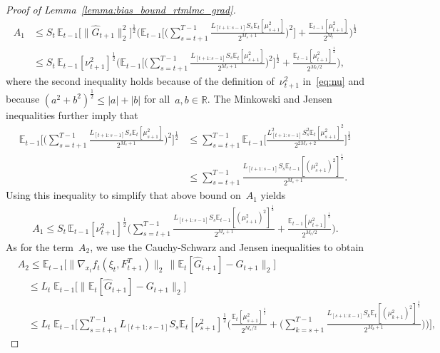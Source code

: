 \documentclass[10pt,a4paper]{amsart}
\newcommand{\EE}{\mathbb{E}}
\begin{document}
\begin{proof}[Proof of Lemma~\ref{lemma:bias_bound_rtmlmc_grad}]
\begin{align*}
    A_1 &\leq S_t \, \EE_{t-1}\Big[\big\|\hat{G}_{t+1}\big\|_2^2\Big]^\frac{1}{2} \Bigg( \EE_{t-1}\bigg[\bigg(\sum_{s=t+1}^{T-1} \frac{L_{[t+1:s-1]} S_s \EE_t[\mu_{s+1}^2]}{2^{M_s + 1}}\bigg)^2\bigg] + \frac{\EE_{t-1}[\mu_{t+1}^2]}{2^{M_t}} \Bigg)^\frac{1}{2}\\
    & \leq S_t \, \EE_{t-1}[\nu_{t+1}^{2}]^\frac{1}{2} \Bigg( \EE_{t-1}\bigg[\bigg(\sum_{s=t+1}^{T-1} \frac{L_{[t+1:s-1]} S_s \EE_t[\mu_{s+1}^2]}{2^{M_s + 1}}\bigg)^2\bigg]^\frac{1}{2} + \frac{\EE_{t-1}[\mu_{t+1}^{2}]^\frac{1}{2}}{2^{M_t/2}} \Bigg),
\end{align*}
where the second inequality holds because of the definition of~$\nu_{t+1}^2$ in~\eqref{eq:nu} and because $(a^2+b^2)^\frac{1}{2} \leq |a| + |b|$ for all~$a,b\in\mathbb R$. The Minkowski and Jensen inequalities further imply that
\begin{align*}
    \EE_{t-1}\bigg[\bigg(\sum_{s=t+1}^{T-1} \frac{L_{[t+1:s-1]} S_s \EE_t[\mu_{s+1}^{2}]}{2^{M_s + 1}}\bigg)^2\bigg]^\frac{1}{2} 
    &\leq \sum_{s=t+1}^{T-1}\EE_{t-1}\bigg[ \frac{L_{[t+1:s-1]}^2 S_s^2 \EE_t[\mu_{s+1}^{2}]^2 }{2^{2M_s + 2}}\bigg]^\frac{1}{2} \\
    &\leq \sum_{s=t+1}^{T-1}\frac{L_{[t+1:s-1]} S_s \EE_{t-1}[(\mu_{s+1}^{2})^2]^\frac{1}{2}}{2^{M_s + 1}}.
\end{align*}
Using this inequality to simplify that above bound on~$A_1$ yields
\begin{align*}
    A_1 \leq S_t \, \EE_{t-1}[\nu_{t+1}^{2}]^\frac{1}{2} \bigg( \sum_{s=t+1}^{T-1} \frac{L_{[t+1:s-1]} S_s \EE_{t-1}[(\mu_{s+1}^{2})^2]^\frac{1}{2}}{2^{M_s + 1}} + \frac{\EE_{t-1}[\mu_{t+1}^{2}]^\frac{1}{2}}{2^{M_t/2}} \bigg).
\end{align*}
As for the term~$A_2$, we use the Cauchy-Schwarz and Jensen inequalities to obtain
\begin{align*}
    &A_2 \leq  \EE_{t-1}\Big[\big\|\nabla_{x_t} f_t \left(\xi_t,F_{t+1}^T\right)\big\|_2 \, \big\|\EE_{t}[\hat{G}_{t+1}]-G_{t+1}  \big\|_2 \Big]\\
    &\quad \leq  L_t \; \EE_{t-1} \Big[\big\|\EE_{t}[\hat{G}_{t+1}]-G_{t+1} \big\|_2\Big]\\
    &\quad \leq L_t \;\EE_{t-1}\bigg[  \sum_{s=t+1}^{T-1}L_{[t+1:s-1]}S_s \EE_t[\nu_{s+1}^{2}]^\frac{1}{2} \bigg(\frac{\EE_{t}[\mu_{s+1}^{2}]^\frac{1}{2} }{2^{M_s/2}} + \bigg(\sum_{k=s+1}^{T-1} \frac{L_{[s+1:k-1]}S_k\EE_{t}[(\mu_{k+1}^{2})^2]^\frac{1}{2}}{2^{M_k + 1}}\bigg) \bigg) \bigg],
\end{align*}

\end{proof}
\end{document}
